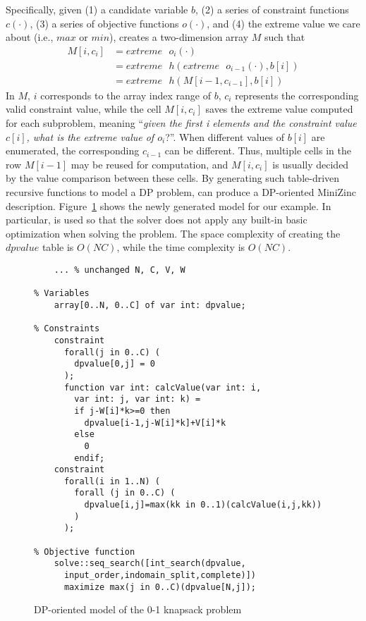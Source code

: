 Specifically, given (1) a candidate variable $b$, (2) a series of constraint functions $c(\cdot)$, (3) a series of objective functions $o(\cdot)$, and (4) the extreme value we care about (i.e., $max$ or $min$), \tool creates a two-dimension array $M$ such that 
\begin{align}
    M[i, c_i]&=extreme\text{ }o_i(\cdot) \nonumber\\
           &=extreme\text{ }h(extreme\text{ }o_{i-1}(\cdot), b[i]) \nonumber \\
           &=extreme\text{ }h(M[i-1, c_{i-1}], b[i]) \tag{3.5}
\end{align}
In $M$, $i$ corresponds to the array index range of $b$,
$c_i$ represents the corresponding valid constraint value, while the cell $M[i, c_i]$ saves the extreme value computed for each subproblem, meaning ``\emph{given the first i elements and the constraint value $c[i]$, what is the extreme value of $o_i$}?''. When different values of $b[i]$ are enumerated, the corresponding $c_{i-1}$ can be different. Thus, multiple cells in the row $M[i-1]$ may be reused for computation, and $M[i, c_i]$ is usually decided
by the value comparison between these cells. 
By generating such table-driven recursive functions to model a DP problem, \tool can produce a DP-oriented MiniZinc description. Figure~\ref{fig:knapsack2} shows the newly generated model for our example. In particular,  is used so that the solver does not apply any built-in basic optimization when solving the problem. 
The space complexity of creating the $dpvalue$ table is $O(NC)$, while the time complexity is $O(NC)$. 

	\begin{figure}[htb]
\begin{lstlisting}[frame=single]
% Input arguments
    ... % unchanged N, C, V, W

% Variables
    array[0..N, 0..C] of var int: dpvalue;

% Constraints
    constraint
      forall(j in 0..C) (
        dpvalue[0,j] = 0
      );
      function var int: calcValue(var int: i, 
        var int: j, var int: k) =
        if j-W[i]*k>=0 then
          dpvalue[i-1,j-W[i]*k]+V[i]*k
        else
          0
        endif;
    constraint
      forall(i in 1..N) (
        forall (j in 0..C) (
          dpvalue[i,j]=max(kk in 0..1)(calcValue(i,j,kk))
        )
      );

% Objective function    
    solve::seq_search([int_search(dpvalue,
      input_order,indomain_split,complete)]) 
      maximize max(j in 0..C)(dpvalue[N,j]);
\end{lstlisting}
\caption{DP-oriented model of the 0-1 knapsack problem}\label{fig:knapsack2}
\end{figure}

